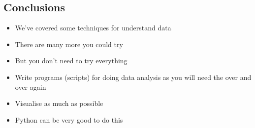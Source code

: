 
\begin{slide}
\section{Conclusions}

\begin{PauseHighLight}
  \begin{itemize}
  \item We've covered some techniques for understand data\pause
  \item There are many more you could try\pause
  \item But you don't need to try everything\pause
  \item Write programs (scripts) for doing data analysis as you will
    need the over and over again\pause
  \item Visualise as much as possible\pause
  \item Python can be very good to do this\pause
  \end{itemize}
\end{PauseHighLight}

\end{slide}


